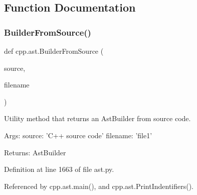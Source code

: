 \subsection{Function Documentation}
\mbox{\label{namespacecpp_1_1ast_a696471f0d7971a0789824803a008cf6b}} 
\subsubsection{\texorpdfstring{Builder\+From\+Source()}{BuilderFromSource()}}
{\footnotesize\ttfamily def cpp.\+ast.\+Builder\+From\+Source (\begin{DoxyParamCaption}\item[{}]{source,  }\item[{}]{filename }\end{DoxyParamCaption})}

\begin{DoxyVerb}Utility method that returns an AstBuilder from source code.

Args:
  source: 'C++ source code'
  filename: 'file1'

Returns:
  AstBuilder
\end{DoxyVerb}
 

Definition at line 1663 of file ast.\+py.



Referenced by cpp.\+ast.\+main(), and cpp.\+ast.\+Print\+Indentifiers().


